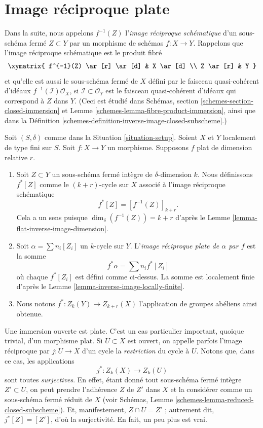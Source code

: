 \section{Image réciproque plate}
\label{section-flat-pullback}

\noindent
Dans la suite, nous appelons $f^{-1}(Z)$
l'{\it image réciproque schématique} d'un sous-schéma fermé
$Z \subset Y$ par un morphisme de schémas $f : X \to Y$.
Rappelons que l'image réciproque schématique est le produit fibré
$$
\xymatrix{
f^{-1}(Z) \ar[r] \ar[d] & X \ar[d] \\
Z \ar[r] & Y
}
$$
et qu'elle est aussi le sous-schéma fermé de $X$ défini par le
faisceau quasi-cohérent d'idéaux $f^{-1}(\mathcal{I})\mathcal{O}_X$, si
$\mathcal{I} \subset \mathcal{O}_Y$ est le faisceau quasi-cohérent d'idéaux
qui correspond à $Z$ dans $Y$.
(Ceci est étudié dans
Schémas, section \ref{schemes-section-closed-immersion} et
Lemme \ref{schemes-lemma-fibre-product-immersion},
ainsi que dans la Définition \ref{schemes-definition-inverse-image-closed-subscheme}.)

\begin{definition}
\label{definition-flat-pullback}
Soit $(S, \delta)$ comme dans la Situation \ref{situation-setup}.
Soient $X$ et $Y$ localement de type fini sur $S$.
Soit $f : X \to Y$ un morphisme.
Supposons $f$ plat de dimension relative $r$.
\begin{enumerate}
\item Soit $Z \subset Y$ un sous-schéma fermé intègre de
$\delta$-dimension $k$. Nous définissons $f^*[Z]$ comme le
$(k+r)$-cycle sur $X$ associé à l'image réciproque schématique
$$
f^*[Z] = [f^{-1}(Z)]_{k+r}.
$$
Cela a un sens puisque $\dim_\delta(f^{-1}(Z)) = k + r$
d'après le Lemme \ref{lemma-flat-inverse-image-dimension}.
\item Soit $\alpha = \sum n_i [Z_i]$ un
$k$-cycle sur $Y$. L'{\it image réciproque plate de $\alpha$ par $f$}
est la somme
$$
f^* \alpha = \sum n_i f^*[Z_i]
$$
où chaque $f^*[Z_i]$ est défini comme ci-dessus.
La somme est localement finie d'après le Lemme \ref{lemma-inverse-image-locally-finite}.
\item Nous notons $f^* : Z_k(Y) \to Z_{k + r}(X)$ l'application de groupes
abéliens ainsi obtenue.
\end{enumerate}
\end{definition}

\noindent
Une immersion ouverte est plate. C'est un cas particulier important, quoique trivial,
d'un morphisme plat. Si $U \subset X$ est ouvert, on appelle parfois
l'image réciproque par $j : U \to X$ d'un cycle la {\it restriction} du
cycle à $U$. Notons que, dans ce cas, les applications
$$
j^* : Z_k(X) \longrightarrow Z_k(U)
$$
sont toutes {\it surjectives}. En effet, étant donné tout sous-schéma fermé
intègre $Z' \subset U$, on peut prendre l'adhérence $Z$ de $Z'$ dans $X$
et la considérer comme un sous-schéma fermé réduit de $X$ (voir
Schémas, Lemme \ref{schemes-lemma-reduced-closed-subscheme}).
Et, manifestement, $Z \cap U = Z'$ ; autrement dit,
$j^*[Z] = [Z']$, d'où la surjectivité. En fait, un peu plus
est vrai.

